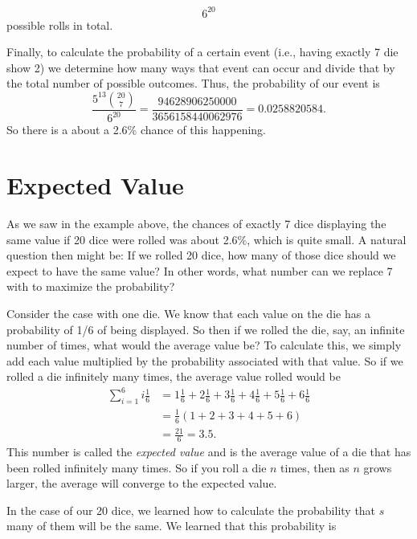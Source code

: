 \documentclass[leqno]{article}
\theoremstyle{definition}
\theoremstyle{remark}
\theoremstyle{definition}
\begin{document}
    \begin{equation*}
        6^{20}
    \end{equation*}
possible rolls in total.\par Finally, to calculate the probability of a certain event (i.e., having exactly 7 die show 2) we determine how many ways that event can occur and divide that by the total number of possible outcomes. Thus, the probability of our event is
    \begin{equation*}
        \frac{5^{13}\binom{20}{7}}{6^20}=\frac{94628906250000}{3656158440062976}=0.0258820584.
    \end{equation*}
So there is a about a 2.6\% chance of this happening.
\section{Expected Value}
As we saw in the example above, the chances of exactly 7 dice displaying the same value if 20 dice were rolled was about 2.6\%, which is quite small. A natural question then might be: If we rolled 20 dice, how many of those dice should we expect to have the same value? In other words, what number can we replace 7 with to maximize the probability?\par Consider the case with one die. We know that each value on the die has a probability of 1/6 of being displayed. So then if we rolled the die, say, an infinite number of times, what would the average value be? To calculate this, we simply add each value multiplied by the probability associated with that value. So if we rolled a die infinitely many times, the average value rolled would be
    \begin{equation*}
        \begin{split}
            \sum_{i=1}^6 i\frac {1}{6}&=1\frac{1}{6}+2\frac{1}{6}+3\frac{1}{6}+4\frac{1}{6}+5\frac{1}{6}+6\frac{1}{6} \\
            &=\frac{1}{6}(1+2+3+4+5+6) \\
            &=\frac{21}{6}=3.5.
        \end{split}
    \end{equation*}
This number is called the \emph{expected value} and is the average value of a die that has been rolled infinitely many times. So if you roll a die $n$ times, then as $n$ grows larger, the average will converge to the expected value.\par In the case of our 20 dice, we learned how to calculate the probability that $s$ many of them will be the same. We learned that this probability is 
\end{document}
